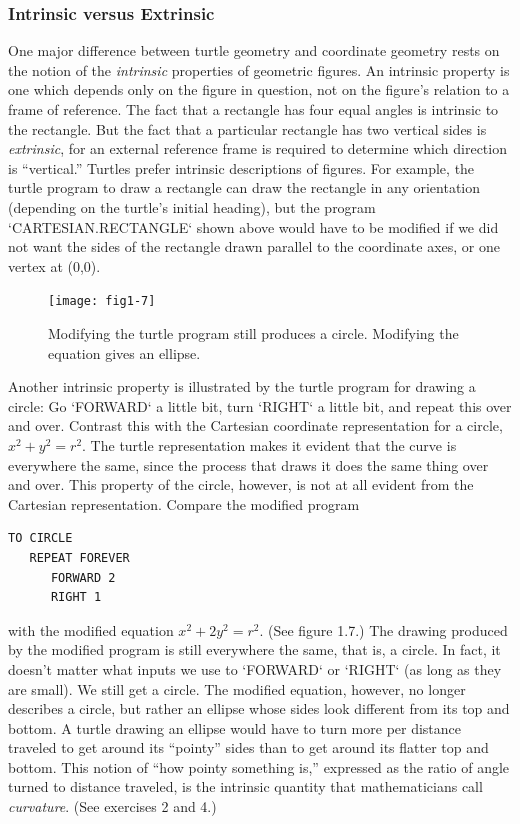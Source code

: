 \documentclass{book}
\begin{document}
\subsubsection{Intrinsic versus Extrinsic}

One major difference between turtle geometry and coordinate geometry
rests on the notion of the {\em intrinsic} properties of geometric figures. An
intrinsic property is one which depends only on the figure in question,
not on the figure's relation to a frame of reference. The fact that a
rectangle has four equal angles is intrinsic to the rectangle. But the
fact that a particular rectangle has two vertical sides is {\em extrinsic}, for
an external reference frame is required to determine which direction is
``vertical.'' Turtles prefer intrinsic descriptions of figures. For example,
the turtle program to draw a rectangle can draw the rectangle in any
orientation (depending on the turtle's initial heading), but the program
\textsc{`CARTESIAN.RECTANGLE`} shown above would have to be modified if we
did not want the sides of the rectangle drawn parallel to the coordinate
axes, or one vertex at (0,0).

\begin{figure}
\begin{center}
\texttt{[image: fig1-7]}
\caption{Modifying the turtle program still produces a circle. Modifying the equation gives an ellipse.}
\end{center}
\end{figure}

Another intrinsic property is illustrated by the turtle program for
drawing a circle: Go \textsc{`FORWARD`} a little bit, turn \textsc{`RIGHT`} a little bit, and
repeat this over and over. Contrast this with the Cartesian coordinate
representation for a circle, $x^2 + y^2 = r^2$. The turtle representation
makes it evident that the curve is everywhere the same, since the process
that draws it does the same thing over and over. This property of the
circle, however, is not at all evident from the Cartesian representation.
Compare the modified program
\begin{verbatim}
TO CIRCLE
   REPEAT FOREVER
      FORWARD 2
      RIGHT 1
\end{verbatim}with the modified equation $x^2 + 2y^2 = r^2$. (See figure 1.7.) The drawing
produced by the modified program is still everywhere the same, that is, a
circle. In fact, it doesn't matter what inputs we use to \textsc{`FORWARD`} or \textsc{`RIGHT`}
(as long as they are small). We still get a circle. The modified equation,
however, no longer describes a circle, but rather an ellipse whose sides
look different from its top and bottom. A turtle drawing an ellipse would
have to turn more per distance traveled to get around its ``pointy'' sides
than to get around its flatter top and bottom. This notion of ``how
pointy something is,'' expressed as the ratio of angle turned to distance
traveled, is the intrinsic quantity that mathematicians call {\em curvature}.
(See exercises 2 and 4.)
\end{document}
